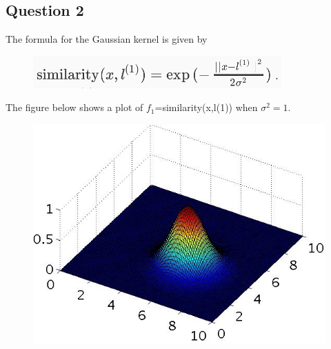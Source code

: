 \documentclass[11pt]{article} %
\begin{document}
\newpage
\subsection*{Question 2}
The formula for the Gaussian kernel is given by %
\begin{figure}[h!]
\centering
\includegraphics[width=0.5\linewidth]{images/SVM-Similarity}

\end{figure}

The figure below shows a plot of $f_1$=similarity(x,l(1)) when $\sigma^2 = 1$.

\begin{figure}[h!]
	\centering
	\includegraphics[width=0.5\linewidth]{images/SVM2}
\end{figure}
\newpage
\end{document}
